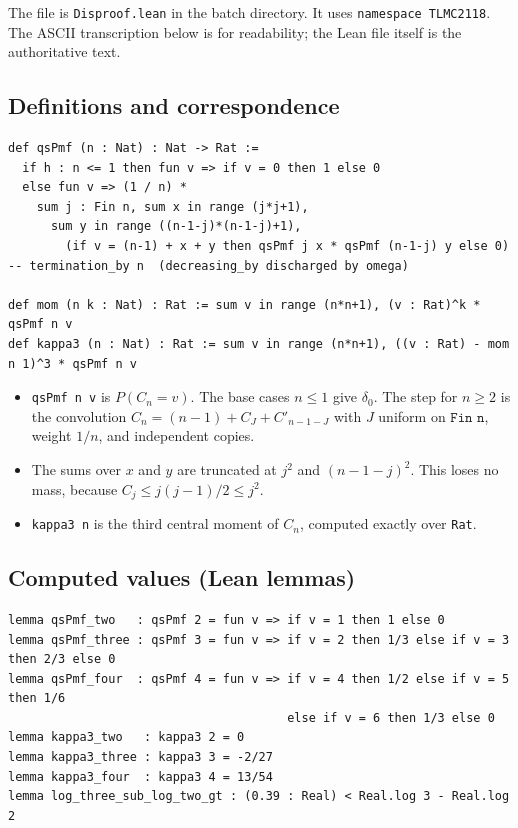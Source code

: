 \documentclass[11pt]{article}
\theoremstyle{definition}
\theoremstyle{plain}
\begin{document}
The file is \texttt{Disproof.lean} in the batch directory. It uses \texttt{namespace TLMC2118}. The ASCII transcription
below is for readability; the Lean file itself is the authoritative text.

\subsection*{Definitions and correspondence}
\begin{lstlisting}
def qsPmf (n : Nat) : Nat -> Rat :=
  if h : n <= 1 then fun v => if v = 0 then 1 else 0
  else fun v => (1 / n) *
    sum j : Fin n, sum x in range (j*j+1),
      sum y in range ((n-1-j)*(n-1-j)+1),
        (if v = (n-1) + x + y then qsPmf j x * qsPmf (n-1-j) y else 0)
-- termination_by n  (decreasing_by discharged by omega)

def mom (n k : Nat) : Rat := sum v in range (n*n+1), (v : Rat)^k * qsPmf n v
def kappa3 (n : Nat) : Rat := sum v in range (n*n+1), ((v : Rat) - mom n 1)^3 * qsPmf n v
\end{lstlisting}

\begin{itemize}
\item \texttt{qsPmf n v} is $P(C_n=v)$. The base cases $n\le 1$ give $\delta_0$. The step for $n\ge 2$ is the convolution
$C_n=(n-1)+C_J+C'_{n-1-J}$ with $J$ uniform on $\texttt{Fin n}$, weight $1/n$, and independent copies.
\item The sums over $x$ and $y$ are truncated at $j^2$ and $(n-1-j)^2$. This loses no mass, because $C_j\le j(j-1)/2\le j^2$.
\item \texttt{kappa3 n} is the third central moment of $C_n$, computed exactly over \texttt{Rat}.
\end{itemize}

\subsection*{Computed values (Lean lemmas)}
\begin{lstlisting}
lemma qsPmf_two   : qsPmf 2 = fun v => if v = 1 then 1 else 0
lemma qsPmf_three : qsPmf 3 = fun v => if v = 2 then 1/3 else if v = 3 then 2/3 else 0
lemma qsPmf_four  : qsPmf 4 = fun v => if v = 4 then 1/2 else if v = 5 then 1/6
                                       else if v = 6 then 1/3 else 0
lemma kappa3_two   : kappa3 2 = 0
lemma kappa3_three : kappa3 3 = -2/27
lemma kappa3_four  : kappa3 4 = 13/54
lemma log_three_sub_log_two_gt : (0.39 : Real) < Real.log 3 - Real.log 2
\end{lstlisting}
\end{document}
